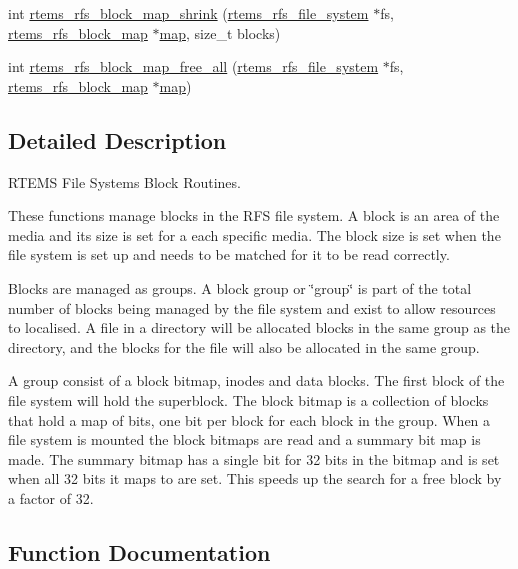 \begin{DoxyCompactItemize}
\item 
int \mbox{\hyperlink{rtems-rfs-block_8c_a1609f6d6ac4378a5df7935a69bb2884d}{rtems\+\_\+rfs\+\_\+block\+\_\+map\+\_\+shrink}} (\mbox{\hyperlink{struct__rtems__rfs__file__system}{rtems\+\_\+rfs\+\_\+file\+\_\+system}} $\ast$fs, \mbox{\hyperlink{rtems-rfs-block_8h_af488270acef452a961e888bffdc3a7bf}{rtems\+\_\+rfs\+\_\+block\+\_\+map}} $\ast$\mbox{\hyperlink{struct__map}{map}}, size\+\_\+t blocks)
\item 
int \mbox{\hyperlink{rtems-rfs-block_8c_a1918b1aa888c6545497402764528ef99}{rtems\+\_\+rfs\+\_\+block\+\_\+map\+\_\+free\+\_\+all}} (\mbox{\hyperlink{struct__rtems__rfs__file__system}{rtems\+\_\+rfs\+\_\+file\+\_\+system}} $\ast$fs, \mbox{\hyperlink{rtems-rfs-block_8h_af488270acef452a961e888bffdc3a7bf}{rtems\+\_\+rfs\+\_\+block\+\_\+map}} $\ast$\mbox{\hyperlink{struct__map}{map}})
\end{DoxyCompactItemize}


\subsection{Detailed Description}
R\+T\+E\+MS File Systems Block Routines. 

These functions manage blocks in the R\+FS file system. A block is an area of the media and its size is set for a each specific media. The block size is set when the file system is set up and needs to be matched for it to be read correctly.

Blocks are managed as groups. A block group or \char`\"{}group\char`\"{} is part of the total number of blocks being managed by the file system and exist to allow resources to localised. A file in a directory will be allocated blocks in the same group as the directory, and the blocks for the file will also be allocated in the same group.

A group consist of a block bitmap, inodes and data blocks. The first block of the file system will hold the superblock. The block bitmap is a collection of blocks that hold a map of bits, one bit per block for each block in the group. When a file system is mounted the block bitmaps are read and a summary bit map is made. The summary bitmap has a single bit for 32 bits in the bitmap and is set when all 32 bits it maps to are set. This speeds up the search for a free block by a factor of 32. 

\subsection{Function Documentation}
\mbox{\label{rtems-rfs-block_8c_a6982a30feb7426e107b0c899b80fbbe6}} 
